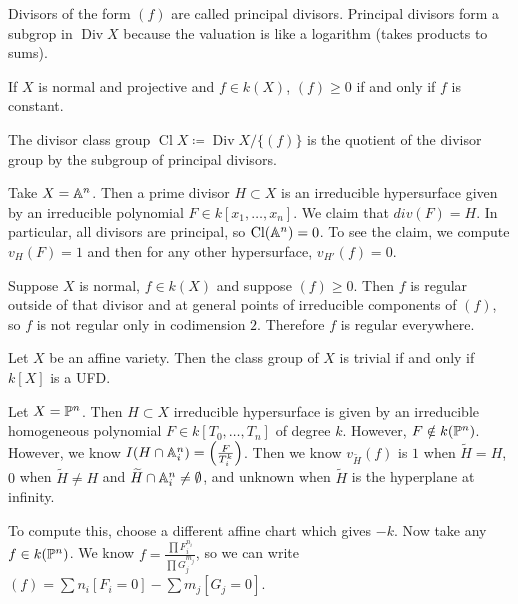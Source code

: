 \documentclass[twoside, 10pt]{article}
\begin{document}
        \begin{rmk} Divisors of the form $(f)$ are called principal divisors.
        Principal divisors form a subgrop in $\operatorname{Div} X$ because the
    valuation is like a logarithm (takes products to sums).  \end{rmk}
        
        \begin{exm} If $X$ is normal and projective and $f \in k(X)$, $(f) \geq
            0$ if and only if $f$ is constant.  \end{exm} \begin{defn} The
            divisor class group $\operatorname{Cl} X \coloneqq
            \operatorname{Div} X / \{(f)\}$ is the quotient of the divisor
        group by the subgroup of principal divisors.  \end{defn}
        
        \begin{exm} Take $X = \A^n$. Then a prime divisor $H \subset X$ is an
            irreducible hypersurface given by an irreducible polynomial $F \in
            k[x_1, \ldots, x_n]$. We claim that $div(F) = H$. In particular,
            all divisors are principal, so $\operatorname{Cl}(\A^n) = 0$. To
        see the claim, we compute $v_H(F) = 1$ and then for any other
    hypersurface, $v_{H'}(f) = 0$.  \end{exm}

        \begin{rmk} Suppose $X$ is normal, $f \in k(X)$ and suppose $(f) \geq
            0$. Then $f$ is regular outside of that divisor and at general
            points of irreducible components of $(f)$, so $f$ is not regular
            only in codimension $2$. Therefore $f$ is regular everywhere.
        \end{rmk}

        \begin{prop}[Homework] Let $X$ be an affine variety. Then the class
        group of $X$ is trivial if and only if $k[X]$ is a UFD.  \end{prop}

        \begin{exm} Let $X = \P^n$. Then $H \subset X$ irreducible hypersurface
            is given by an irreducible homogeneous polynomial $F \in k[T_0,
            \ldots, T_n]$ of degree $k$. However, $F \notin k(\P^n)$. However,
            we know $I(H \cap \A^n_i) = \left(\frac{F}{T_i^k}\right)$. Then we
            know $v_{\widetilde{H}}(f)$ is $1$ when $\widetilde{H} = H$, $0$
            when $\widetilde{H} \neq H$ and $\widetilde{H} \cap \A^n_i \neq
            \emptyset$, and unknown when $\widetilde{H}$ is the hyperplane at
            infinity.

            To compute this, choose a different affine chart which gives $-k$.
        Now take any $f \in k(\P^n)$. We know $f = \frac{\prod F_i^{n_i}}{\prod
    G_j^{m_j}}$, so we can write $(f) = \sum n_i [F_i = 0] - \sum m_j[G_j =
0]$.  \end{exm}
\end{document}

